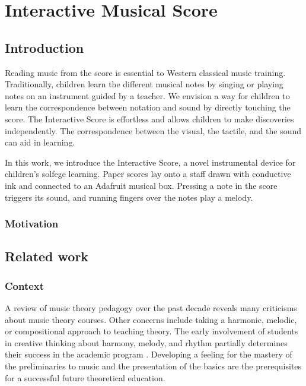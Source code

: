 \chapter{Interactive Musical Score}

\section{Introduction}

Reading music from the score is essential to Western classical music training. Traditionally, children learn the different musical notes by singing or playing notes on an instrument guided by a teacher. We envision a way for children to learn the correspondence between notation and sound by directly touching the score.
The Interactive Score is effortless and allows children to make discoveries independently. The correspondence between the visual, the tactile, and the sound can aid in learning.

In this work, we introduce the Interactive Score, a novel instrumental device for children's solfege learning. Paper scores lay onto a staff drawn with conductive ink and connected to an Adafruit musical box. Pressing a note in the score triggers its sound, and running fingers over the notes play a melody.

\subsection*{Motivation}

\section{Related work}

\subsection{Context}

A review of music theory pedagogy over the past decade reveals many criticisms about music theory courses. Other concerns include taking a harmonic, melodic, or compositional approach to teaching theory. The early involvement of students in creative thinking about harmony, melody, and rhythm partially determines their success in the academic program \cite{bland1977college}. Developing a feeling for the mastery of the preliminaries to music and the presentation of the basics are the prerequisites for a successful future theoretical education.

